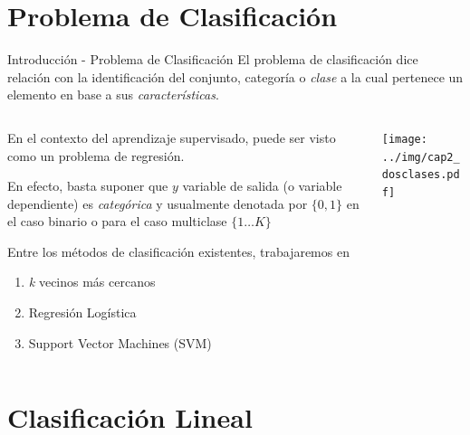 \documentclass[9pt]{beamer}
\begin{document}
\section{Problema de Clasificación}
\begin{frame}{Introducción - Problema de Clasificación}
El problema de clasificación dice relación con la identificación del conjunto, categoría o \emph{clase} a la cual pertenece un elemento en base a sus \emph{características}. \vspace{0.5cm} \pause

\begin{columns}

  \begin{column}{0.5\textwidth}
    En el contexto del aprendizaje supervisado, puede ser visto como un problema de regresión. \vspace{0.5cm} \pause

    En efecto, basta suponer que $y$ variable de salida (o variable dependiente) es \emph{categórica} y usualmente denotada por $\{ 0 , 1 \}$ en el caso binario o para el caso multiclase $\{ 1 \dots K \}$ \vspace{0.5cm} \pause

    Entre los métodos de clasificación existentes, trabajaremos en 

    \begin{enumerate}
      \item \emph{k} vecinos más cercanos \pause
      \item Regresión Logística \pause
      \item Support Vector Machines (SVM) \pause

    \end{enumerate}


  \end{column}

  \begin{column}{0.5\textwidth}
    \centering
    \texttt{[image: ../img/cap2\_dosclases.pdf]}\\
    \label{fig:puntos_2d}
  \end{column}


\end{columns}


\end{frame}

\section{Clasificación Lineal}
\end{document}
